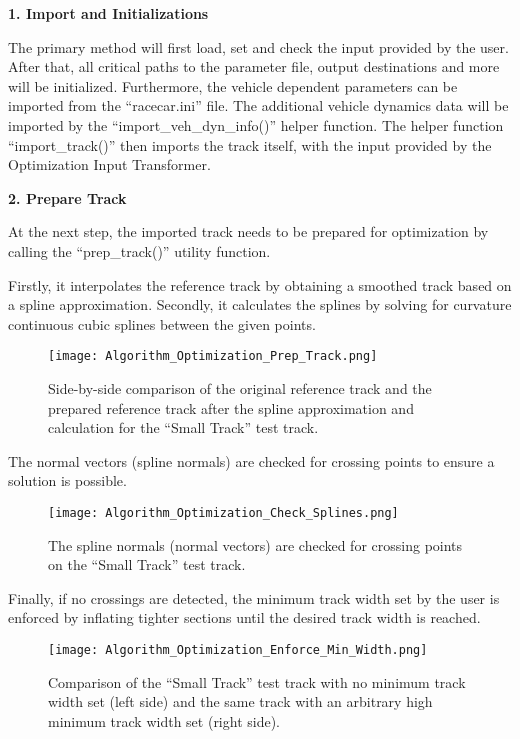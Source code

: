 \textbf{1. Import and Initializations}

The primary method will first load, set and check the input provided by the user. After that, all critical paths to the parameter file, output destinations and more will be initialized. Furthermore, the vehicle dependent parameters can be imported from the ``racecar.ini'' file. The additional vehicle dynamics data will be imported by the ``import\_veh\_dyn\_info()'' helper function. The helper function ``import\_track()'' then imports the track itself, with the input provided by the Optimization Input Transformer.

\textbf{2. Prepare Track}

At the next step, the imported track needs to be prepared for optimization by calling the ``prep\_track()'' utility function.

Firstly, it interpolates the reference track by obtaining a smoothed track based on a spline approximation. Secondly, it calculates the splines by solving for curvature continuous cubic splines between the given points.
\begin{figure}[H]
    \centering
    \texttt{[image: Algorithm\_Optimization\_Prep\_Track.png]}
    \caption{Side-by-side comparison of the original reference track and the prepared reference track after the spline approximation and calculation for the ``Small Track'' test track.}
    \label{fig:Optimization Algorithm Prepare Track}
\end{figure}
The normal vectors (spline normals) are checked for crossing points to ensure a solution is possible.
\begin{figure}[H]
    \centering
    \texttt{[image: Algorithm\_Optimization\_Check\_Splines.png]}
    \caption{The spline normals (normal vectors) are checked for crossing points on the ``Small Track'' test track.}
    \label{fig:Optimization Algorithm Check Spline Normals for Crossing Points}
\end{figure}
Finally, if no crossings are detected, the minimum track width set by the user is enforced by inflating tighter sections until the desired track width is reached.
\begin{figure}[H]
    \centering
    \texttt{[image: Algorithm\_Optimization\_Enforce\_Min\_Width.png]}
    \caption{Comparison of the ``Small Track'' test track with no minimum track width set (left side) and the same track with an arbitrary high minimum track width set (right side).}
    \label{fig:Optimization Algorithm Check Spline Normals for Crossing Points}
\end{figure}

